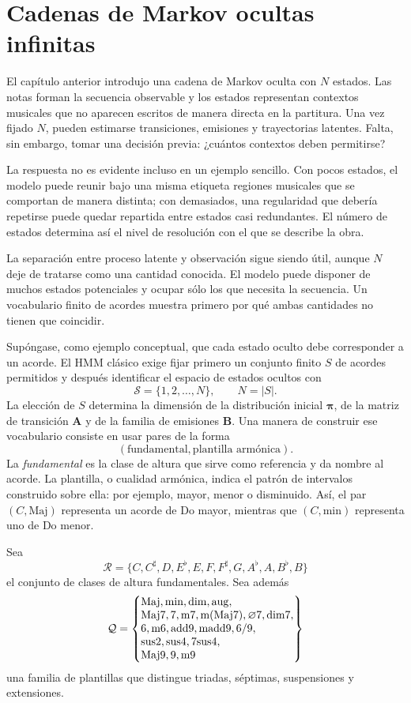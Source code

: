 \chapter{Cadenas de Markov ocultas infinitas} 
\label{chap:ihmm}
\label{sec:proyecto}

El capítulo anterior introdujo una cadena de Markov oculta con $N$ estados. Las notas forman la secuencia observable y los estados representan contextos musicales que no aparecen escritos de manera directa en la partitura. Una vez fijado $N$, pueden estimarse transiciones, emisiones y trayectorias latentes. Falta, sin embargo, tomar una decisión previa: ¿cuántos contextos deben permitirse?

La respuesta no es evidente incluso en un ejemplo sencillo. Con pocos estados, el modelo puede reunir bajo una misma etiqueta regiones musicales que se comportan de manera distinta; con demasiados, una regularidad que debería repetirse puede quedar repartida entre estados casi redundantes. El número de estados determina así el nivel de resolución con el que se describe la obra.

La separación entre proceso latente y observación sigue siendo útil, aunque $N$ deje de tratarse como una cantidad conocida. El modelo puede disponer de muchos estados potenciales y ocupar sólo los que necesita la secuencia. Un vocabulario finito de acordes muestra primero por qué ambas cantidades no tienen que coincidir.

Supóngase, como ejemplo conceptual, que cada estado oculto debe corresponder a un acorde. El HMM clásico exige fijar primero un conjunto finito $S$ de acordes permitidos y después identificar el espacio de estados ocultos con
\[
\mathcal{S}=\{1,2,\dots,N\},
\qquad N=\lvert S\rvert.
\]
La elección de $S$ determina la dimensión de la distribución inicial $\boldsymbol{\pi}$, de la matriz de transición $\mathbf{A}$ y de la familia de emisiones $\mathbf{B}$. Una manera de construir ese vocabulario consiste en usar pares de la forma
\[
(\text{fundamental},\text{plantilla armónica}).
\]
La \emph{fundamental} es la clase de altura que sirve como referencia y da nombre al acorde. La plantilla, o cualidad armónica, indica el patrón de intervalos construido sobre ella: por ejemplo, mayor, menor o disminuido. Así, el par $(C,\mathrm{Maj})$ representa un acorde de Do mayor, mientras que $(C,\mathrm{min})$ representa uno de Do menor.

Sea
\[
\mathcal{R}
=
\{C,C^\sharp,D,E^\flat,E,F,F^\sharp,G,A^\flat,A,B^\flat,B\}
\]
el conjunto de clases de altura fundamentales. Sea además
\[
\mathcal{Q}=
\left\{
\begin{array}{@{}l@{}}
\mathrm{Maj},\mathrm{min},\mathrm{dim},\mathrm{aug},\\
\mathrm{Maj7},7,\mathrm{m7},\mathrm{m(Maj7)},\varnothing 7,\mathrm{dim7},\\
6,\mathrm{m6},\mathrm{add9},\mathrm{madd9},6/9,\\
\mathrm{sus2},\mathrm{sus4},7\mathrm{sus4},\\
\mathrm{Maj9},9,\mathrm{m9}
\end{array}
\right\}
\]
una familia de plantillas que distingue triadas, séptimas, suspensiones y extensiones.


